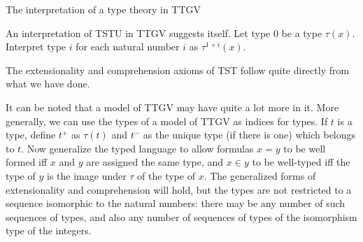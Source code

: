 \documentclass{slides}
\begin{document}
\begin{slide}
{\Large The interpretation of a type theory in TTGV}

An interpretation of TSTU in TTGV suggests itself.  Let type 0 be a type $\tau(x)$.  Interpret type $i$ for each natural number $i$ as $\tau^{1+i}(x)$.

The extensionality and comprehension axioms of TST follow quite directly from what we have done.

It can be noted that a model of TTGV may have quite a lot more in it.   More generally, we can use the types of a model of TTGV as indices for types.  If $t$ is a type, define $t^+$ as $\tau(t)$ and $t^-$ as the unique type (if there is one) which belongs to $t$.
Now generalize the typed language to allow formulas $x = y$ to be well formed iff $x$ and $y$ are assigned the same type, and $x \in y$ to be well-typed iff the type of $y$ is the image under $\tau$ of the type of $x$.
The generalized forms of extensionality and comprehension will hold, but the types are not restricted to a sequence isomorphic to the natural numbers:  there may be any number of such sequences of types, and also any number of sequences of types of the isomorphism type of the integers.


\end{slide}
\end{document}
